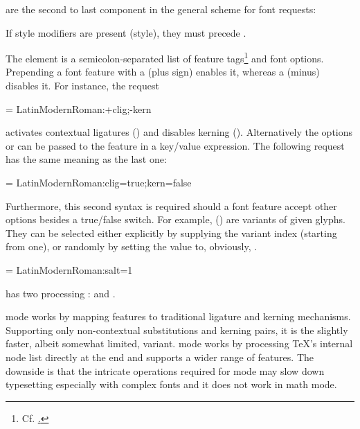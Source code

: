  are the second to last component in the
general scheme for font requests:

\beginnarrower
  \nonproportional{:}%
  \nonproportional{:}%
\endnarrower

\noindent
If style modifiers are present (\XETEX style), they must precede
.

The element  is a semicolon-separated list of feature
tags\footnote{%
  Cf. \hyperlink {http://www.microsoft.com/typography/otspec/featurelist.htm}.
}
and font options.
%
Prepending a font feature with a \inlinecode{+} (plus sign) enables it,
whereas a \inlinecode{-} (minus) disables it. For instance, the request

\beginlisting
  \font \test = LatinModernRoman:+clig;-kern
\endlisting

\noindent activates contextual ligatures () and
disables kerning ().
%
Alternatively the options  or  can
be passed to the feature in a key/value expression.
%
The following request has the same meaning as the last one:

\beginlisting
  \font \test = LatinModernRoman:clig=true;kern=false
\endlisting

\noindent
Furthermore, this second syntax is required should a font feature
accept other options besides a true/false switch.
%
For example,  () are
variants of given glyphs.
%
They can be selected either explicitly by supplying the variant
index (starting from one), or randomly by setting the value to,
obviously, .

\beginlisting
  \font \librmsaltfirst = LatinModernRoman:salt=1
\endlisting


\begindescriptions

          has two \OpenType processing
         :
          and .

          mode works by mapping \OpenType
         features to traditional \TEX ligature and kerning mechanisms.
         Supporting only non-contextual substitutions and kerning
         pairs, it is the slightly faster, albeit somewhat limited, variant.
          mode works by processing \TeX’s internal
         node list directly at the \LUA end and supports
         a wider range of \OpenType features.
         The downside is that the intricate operations required for
          mode may slow down typesetting especially
         with complex fonts and it does not work in math mode.

